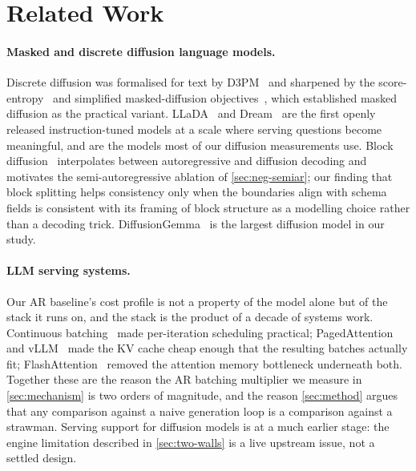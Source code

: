 %
\section{Related Work}
\label{sec:related}

\paragraph{Masked and discrete diffusion language models.} Discrete diffusion
was formalised for text by D3PM~\cite{austin2021d3pm} and sharpened by the
score-entropy~\cite{lou2024sedd} and simplified masked-diffusion
objectives~\cite{sahoo2024mdlm}, which established masked diffusion as the
practical variant. LLaDA~\cite{nie2025llada} and Dream~\cite{ye2025dream} are the
first openly released instruction-tuned models at a scale where serving
questions become meaningful, and are the models most of our diffusion
measurements use. Block diffusion~\cite{arriola2025blockdiffusion} interpolates
between autoregressive and diffusion decoding and motivates the
semi-autoregressive ablation of \cref{sec:neg-semiar}; our finding that block
splitting helps consistency only when the boundaries align with schema fields is
consistent with its framing of block structure as a modelling choice rather than
a decoding trick. DiffusionGemma~\cite{diffusiongemma} is the largest diffusion
model in our study. 

\paragraph{LLM serving systems.} Our AR baseline's cost profile is not a
property of the model alone but of the stack it runs on, and the stack is the
product of a decade of systems work. Continuous batching~\cite{yu2022orca} made
per-iteration scheduling practical; PagedAttention and
vLLM~\cite{kwon2023vllm} made the KV cache cheap enough that the resulting
batches actually fit; FlashAttention~\cite{dao2022flashattention} removed the
attention memory bottleneck underneath both. Together these are the reason the
AR batching multiplier we measure in \cref{sec:mechanism} is two orders of
magnitude, and the reason \cref{sec:method} argues that any comparison against a
naive generation loop is a comparison against a strawman. Serving support for
diffusion models is at a much earlier stage: the engine limitation described in
\cref{sec:two-walls} is a live upstream issue, not a settled design.

